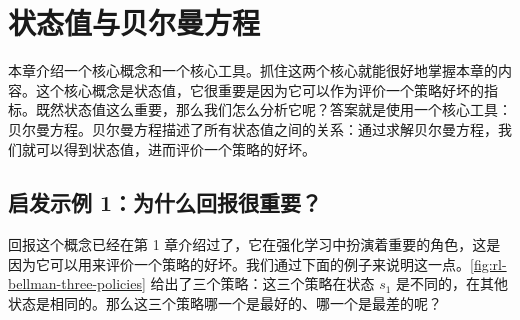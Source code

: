 \chapter{状态值与贝尔曼方程}
\label{ch:rl-bellman}



本章介绍一个核心概念和一个核心工具。抓住这两个核心就能很好地掌握本章的内容。这个核心概念是状态值，它很重要是因为它可以作为评价一个策略好坏的指标。既然状态值这么重要，那么我们怎么分析它呢？答案就是使用一个核心工具：贝尔曼方程。贝尔曼方程描述了所有状态值之间的关系：通过求解贝尔曼方程，我们就可以得到状态值，进而评价一个策略的好坏。

\section{启发示例 1：为什么回报很重要？}
\label{sec:rl-bellman-why-return}

回报这个概念已经在第 1 章介绍过了，它在强化学习中扮演着重要的角色，这是因为它可以用来评价一个策略的好坏。我们通过下面的例子来说明这一点。\cref{fig:rl-bellman-three-policies} 给出了三个策略：这三个策略在状态 $s_1$ 是不同的，在其他状态是相同的。那么这三个策略哪一个是最好的、哪一个是最差的呢？

